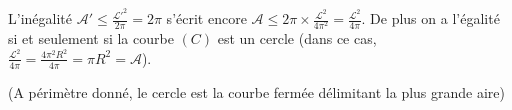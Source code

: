 {{L'inégalité $\mathcal{A}'\leqslant \frac{\mathcal{L}'^2}{2\pi}=2\pi$ s'écrit encore $\mathcal{A}\leqslant2\pi\times \frac{\mathcal{L}^2}{4\pi^2}= \frac{\mathcal{L}^2}{4\pi}$. De plus on a l'égalité si et seulement si la courbe $(C)$ est un cercle (dans ce cas, $ \frac{\mathcal{L}^2}{4\pi}= \frac{4\pi^2R^2}{4\pi}=\pi R^2=\mathcal{A}$).

\begin{center}
\end{center}

(A périmètre donné, le cercle est la courbe fermée délimitant la plus grande aire)}
}